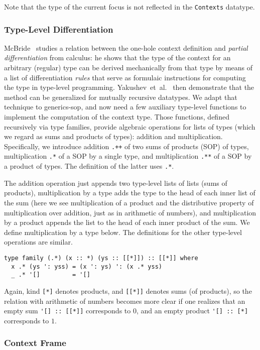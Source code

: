 \documentclass[runningheads]{llncs}
\newcommand{\K}[1]{\lstinline{#1}}
\begin{document}
Note that the type of the current focus is not reflected in the \K{Contexts} datatype.

\subsubsection{Type-Level Differentiation}

McBride~\cite{McBride2001} studies a relation between the one-hole context definition and \emph{partial differentiation} from calculus: he shows that the type of the context for an arbitrary (regular) type can be derived mechanically from that type by means of a list of differentiation \emph{rules} that serve as formulaic instructions for computing the type in type-level programming. Yakushev~et~al.~\cite{MuRec2009} then demonstrate that the method can be generalized for mutually recursive datatypes. We adapt that technique to \textsf{generics-sop}, and now need a few auxiliary type-level functions to implement the computation of the context type. Those functions, defined recursively via type families, provide algebraic operations for lists of types (which we regard as sums and products of types): addition and multiplication. Specifically, we introduce addition \K{.++} of two sums of products (SOP) of types, multiplication \K{.*} of a SOP by a single type, and multiplication \K{.**} of a SOP by a product of types. The definition of the latter uses \K{.*}.

The addition operation just appends two type-level lists of lists (sums of products), multiplication by a type adds the type to the head of each inner list of the sum (here we see multiplication of a product and the distributive property of multiplication over addition, just as in arithmetic of numbers), and multiplication by a product appends the list to the head of each inner product of the sum. We define multiplication by a type below. The definitions for the other type-level operations are similar.
\begin{lstlisting}
type family (.*) (x :: *) (ys :: [[*]]) :: [[*]] where
  x .* (ys ': yss) = (x ': ys) ': (x .* yss)
  _ .* '[]         = '[]
\end{lstlisting}

Again, kind \K{[*]} denotes products, and \K{[[*]]} denotes sums (of products), so the relation with arithmetic of numbers becomes more clear if one realizes that an empty sum \K{'[] :: [[*]]} corresponds to $0$, and an empty product \K{'[] :: [*]} corresponds to $1$.

\subsubsection{Context Frame}
\end{document}
